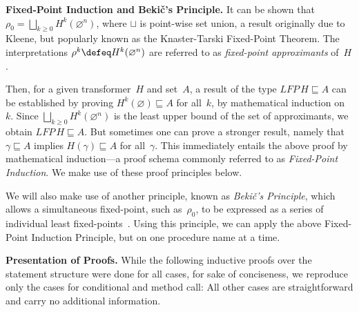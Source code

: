 \documentclass[a4paper,numberwithinsect]{lipics-v2021}
\begin{document}


\noindent\textbf{Fixed-Point Induction and Beki\v{c}'s Principle.}
% 
It can be shown that
$\rho_0 = \bigsqcup_{k \geq 0} H^k (\varnothing^n)$, where $\sqcup$ is
point-wise set union, a result originally due to Kleene, but popularly
known as the Knaster-Tarski Fixed-Point Theorem.
The interpretations $\rho^k \defeq H^k (\varnothing^n)$ are referred
to as \emph{fixed-point approximants} of~$H$.

Then, for a given transformer~$H$ and set~$A$, a result of the type
$\mathit{LFP}\, H \sqsubseteq A$ can be established by proving
$H^k (\varnothing) \sqsubseteq A$ for all~$k$, by mathematical
induction on~$k$. Since $\bigsqcup_{k \geq 0} H^k (\varnothing^n)$ is
the least upper bound of the set of approximants, we obtain
$\mathit{LFP}\, H \sqsubseteq A$.
%
But sometimes one can prove a stronger result, namely that
$\gamma \sqsubseteq A$ implies $H (\gamma) \sqsubseteq A$ for
all~$\gamma$. This immediately entails the above proof by mathematical
induction---a proof schema commonly referred to as \emph{Fixed-Point
  Induction}.
%
We make use of these proof principles below.

We will also make use of another principle, known as \emph{Beki\v{c}'s
  Principle}, which allows a simultaneous fixed-point, such
as~$\rho_0$, to be expressed as a series of individual least
fixed-points~\cite{bek-69}.
%
Using this principle, we can apply the above Fixed-Point Induction
Principle, but on one procedure name at a time.


\smallskip

\noindent\textbf{Presentation of Proofs.}
%
While the following inductive proofs over the statement structure were
done for all cases, for sake of conciseness, we reproduce only the
cases for conditional and method call: All other cases are
straightforward and carry no additional information.

\end{document}
